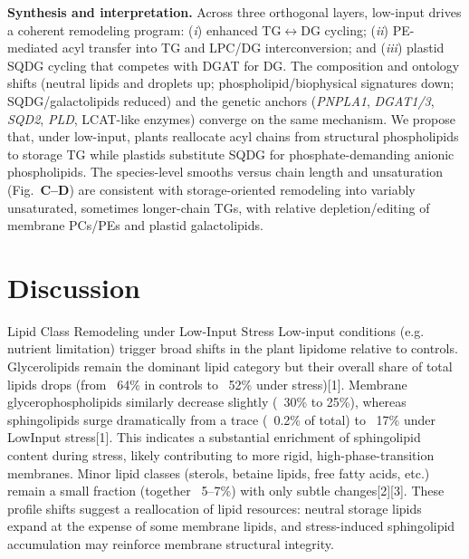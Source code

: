 \documentclass[10pt,letterpaper]{article}
\begin{document}
\begin{itemize}
\noindent \textbf{Synthesis and interpretation.}
Across three orthogonal layers, low-input drives a coherent remodeling program: (\emph{i}) enhanced TG$\leftrightarrow$DG cycling; (\emph{ii}) PE-mediated acyl transfer into TG and LPC/DG interconversion; and (\emph{iii}) plastid SQDG cycling that competes with DGAT for DG. The composition and ontology shifts (neutral lipids and droplets up; phospholipid/biophysical signatures down; SQDG/galactolipids reduced) and the genetic anchors (\textit{PNPLA1}, \textit{DGAT1/3}, \textit{SQD2}, \textit{PLD}, LCAT-like enzymes) converge on the same mechanism. We propose that, under low-input, plants reallocate acyl chains from structural phospholipids to storage TG while plastids substitute SQDG for phosphate-demanding anionic phospholipids. The species-level smooths versus chain length and unsaturation (Fig.\ \textbf{C–D}) are consistent with storage-oriented remodeling into variably unsaturated, sometimes longer-chain TGs, with relative depletion/editing of membrane PCs/PEs and plastid galactolipids.













\section*{Discussion}
Lipid Class Remodeling under Low-Input Stress
Low-input conditions (e.g. nutrient limitation) trigger broad shifts in the plant lipidome relative to controls. Glycerolipids remain the dominant lipid category but their overall share of total lipids drops (from ~64\% in controls to ~52\% under stress)[1]. Membrane glycerophospholipids similarly decrease slightly (~30\% to 25\%), whereas sphingolipids surge dramatically from a trace (~0.2\% of total) to ~17\% under LowInput stress[1]. This indicates a substantial enrichment of sphingolipid content during stress, likely contributing to more rigid, high-phase-transition membranes. Minor lipid classes (sterols, betaine lipids, free fatty acids, etc.) remain a small fraction (together ~5–7\%) with only subtle changes[2][3]. These profile shifts suggest a reallocation of lipid resources: neutral storage lipids expand at the expense of some membrane lipids, and stress-induced sphingolipid accumulation may reinforce membrane structural integrity.


\end{itemize}
\end{document}
